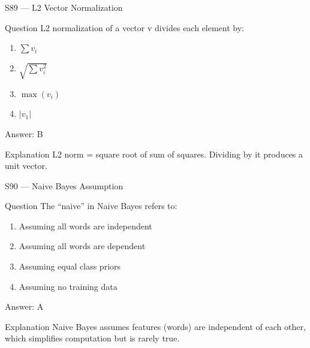 \documentclass[aspectratio=169,8pt]{beamer}
\begin{document}
	\begin{frame}{S89 --- L2 Vector Normalization}
		\begin{block}{Question}
			L2 normalization of a vector v divides each element by:
			\begin{enumerate}
				\item $\sum v_i$
				\item $\sqrt{\sum v_i^2}$
				\item $\max(v_i)$
				\item $|v_1|$
			\end{enumerate}
		\end{block}
		\begin{exampleblock}{Answer: B}\end{exampleblock}
		\begin{block}{Explanation}
			L2 norm = square root of sum of squares. Dividing by it produces a unit vector.
		\end{block}
	\end{frame}
	
	\begin{frame}{S90 --- Naive Bayes Assumption}
		\begin{block}{Question}
			The ``naive'' in Naive Bayes refers to:
			\begin{enumerate}
				\item Assuming all words are independent
				\item Assuming all words are dependent
				\item Assuming equal class priors
				\item Assuming no training data
			\end{enumerate}
		\end{block}
		\begin{exampleblock}{Answer: A}\end{exampleblock}
		\begin{block}{Explanation}
			Naive Bayes assumes features (words) are independent of each other, which simplifies computation but is rarely true.
		\end{block}
	\end{frame}
	
\end{document}
